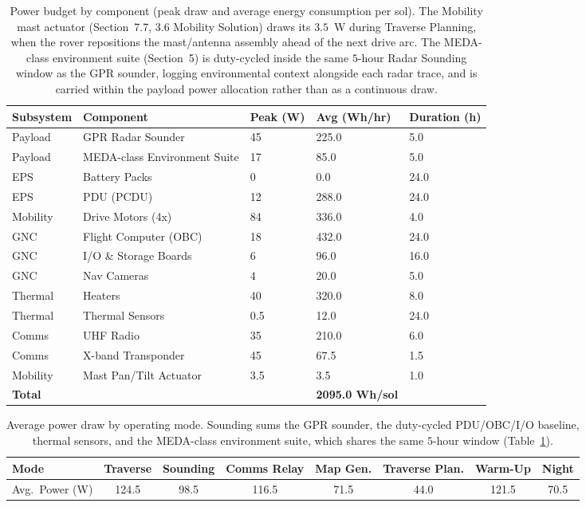 \documentclass[11pt]{article}
\begin{document}
\begin{table}[H]
\centering
\footnotesize
\begin{tabular}{p{1.5cm}p{3.3cm}p{1.5cm}p{1.9cm}p{1.9cm}}
\toprule
\textbf{Subsystem} & \textbf{Component} & \textbf{Peak (W)} & \textbf{Avg (Wh/hr)} &
\textbf{Duration (h)} \\
\midrule
Payload & GPR Radar Sounder & 45 & 225.0 & 5.0 \\
Payload & MEDA-class Environment Suite & 17 & 85.0 & 5.0 \\
EPS & Battery Packs & 0 & 0.0 & 24.0 \\
EPS & PDU (PCDU) & 12 & 288.0 & 24.0 \\
Mobility & Drive Motors (4x) & 84 & 336.0 & 4.0 \\
GNC & Flight Computer (OBC) & 18 & 432.0 & 24.0 \\
GNC & I/O \& Storage Boards & 6 & 96.0 & 16.0 \\
GNC & Nav Cameras & 4 & 20.0 & 5.0 \\
Thermal & Heaters & 40 & 320.0 & 8.0 \\
Thermal & Thermal Sensors & 0.5 & 12.0 & 24.0 \\
Comms & UHF Radio & 35 & 210.0 & 6.0 \\
Comms & X-band Transponder & 45 & 67.5 & 1.5 \\
Mobility & Mast Pan/Tilt Actuator & 3.5 & 3.5 & 1.0 \\
\midrule
\textbf{Total} & & & \textbf{2095.0 Wh/sol} & \\
\bottomrule
\end{tabular}
\caption{Power budget by component (peak draw and average energy consumption per sol). The
Mobility mast actuator (Section~7.7, 3.6 Mobility Solution) draws its $3.5$~W during Traverse
Planning, when the rover repositions the mast/antenna assembly ahead of the next drive arc. The
MEDA-class environment suite (Section~5) is duty-cycled inside the same $5$-hour Radar Sounding
window as the GPR sounder, logging environmental context alongside each radar trace, and is
carried within the payload power allocation rather than as a continuous draw.}
\label{tab:power-budget}
\end{table}

\begin{table}[H]
\centering
\small
\begin{tabular}{lccccccc}
\toprule
\textbf{Mode} & Traverse & Sounding & Comms Relay & Map Gen. & Traverse Plan. & Warm-Up & Night \\
\midrule
Avg.\ Power (W) & 124.5 & 98.5 & 116.5 & 71.5 & 44.0 & 121.5 & 70.5 \\
\bottomrule
\end{tabular}
\caption{Average power draw by operating mode. Sounding sums the GPR sounder, the duty-cycled
PDU/OBC/I/O baseline, thermal sensors, and the MEDA-class environment suite, which shares the
same $5$-hour window (Table~\ref{tab:power-budget}).}
\label{tab:power-modes}
\end{table}
\end{document}
